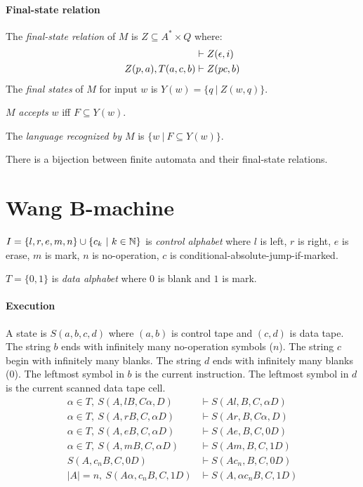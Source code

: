 \paragraph{Final-state relation}
The \emph{final-state relation} of \(M\) is \(Z \subseteq A^* \times Q\) where:
\begin{align*}
    &\vdash Z(\epsilon,i)
    \\
    Z(p,a), T(a,c,b) &\vdash Z(pc,b)
\end{align*}
The \emph{final states} of \(M\) for input \(w\) is \(Y(w) = \{ q ~|~ Z(w,q) \}\).

\(M\) \emph{accepts} \(w\) iff \(F \subseteq Y(w)\).

The \emph{language recognized by \(M\)} is \(\{ w ~|~ F \subseteq Y(w) \}\).

There is a bijection between finite automata and their final-state relations.

\section{Wang B-machine}

\(I = \{ l,r,e,m,n \} \cup \{ c_k ~|~ k \in \mathbb{N} \}\) is \emph{control alphabet}
where \(l\) is left, \(r\) is right, \(e\) is erase,
\(m\) is mark, \(n\) is no-operation,
\(c\) is conditional-absolute-jump-if-marked.

\(T = \{0,1\}\) is \emph{data alphabet} where \(0\) is blank and \(1\) is mark.

\paragraph{Execution}
A state is \(S(a,b,c,d)\) where \((a,b)\) is control tape and \((c,d)\) is data tape.
The string \(b\) ends with infinitely many no-operation symbols (\(n\)).
The string \(c\) begin with infinitely many blanks.
The string \(d\) ends with infinitely many blanks (\(0\)).
The leftmost symbol in \(b\) is the current instruction.
The leftmost symbol in \(d\) is the current scanned data tape cell.
\begin{align*}
    \alpha \in T, ~ S(A,l B,C \alpha,D) &\vdash S(A l,B,C,\alpha D)
    \\
    \alpha \in T, ~ S(A,r B,C,\alpha D) &\vdash S(A r,B,C \alpha,D)
    \\
    \alpha \in T, ~ S(A,e B,C,\alpha D) &\vdash S(A e,B,C,0 D)
    \\
    \alpha \in T, ~ S(A,m B,C,\alpha D) &\vdash S(A m,B,C,1 D)
    \\
    S(A,c_n B,C,0 D) &\vdash S(A c_n,B,C,0 D)
    \\
    |A| = n, ~ S(A \alpha, c_n B, C, 1 D) &\vdash S(A, \alpha c_n B, C, 1 D)
\end{align*}


